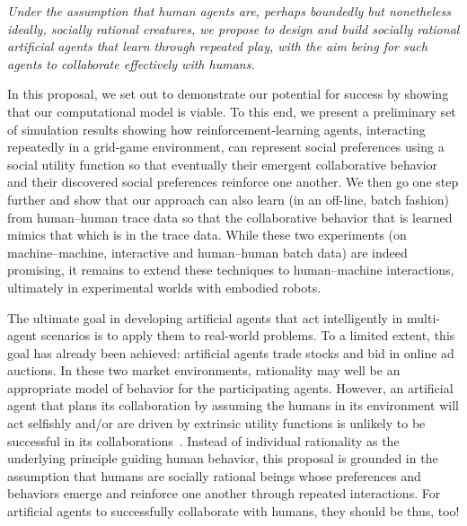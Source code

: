\emph{Under the assumption that human agents are, perhaps boundedly
  but nonetheless ideally, socially rational creatures, we propose to
  design and build socially rational artificial agents that learn
  through repeated play, with the aim being for such agents to
  collaborate effectively with humans.}

In this proposal, we set out to demonstrate our potential for success
by showing that our computational model is viable.  To this end,
we present a preliminary set of simulation results showing how
reinforcement-learning agents, interacting repeatedly in a grid-game
environment, can represent social preferences using a social utility
function so that eventually their emergent collaborative behavior and
their discovered social preferences reinforce one another.  We then go
one step further and show that our approach can also learn (in an
off-line, batch fashion) from human--human trace data so that the
collaborative behavior that is learned mimics that which is
in the trace data.  While these two experiments (on machine--machine,
interactive and human--human batch data) are indeed promising, it
remains to extend these techniques to human--machine interactions,
ultimately in experimental worlds with embodied robots.

The ultimate goal in developing artificial agents that act
intelligently in multi-agent scenarios is to apply them to real-world
problems.  To a limited extent, this goal has already been achieved:
artificial agents trade stocks and bid in online ad auctions.  In
these two market environments, rationality may well be an appropriate
model of behavior for the participating agents.  However,
an artificial agent that plans its collaboration by assuming the
humans in its environment will act selfishly and/or are driven by
extrinsic utility functions is unlikely to be successful in its
collaborations~\cite{Camerer:2003,kahnemanst82,gal04}.  Instead of
individual rationality as the underlying principle guiding human
behavior, this proposal is grounded in the assumption that humans are
socially rational beings whose preferences and behaviors emerge and
reinforce one another through repeated interactions.  For artificial
agents to successfully collaborate with humans, they should be thus,
too!

